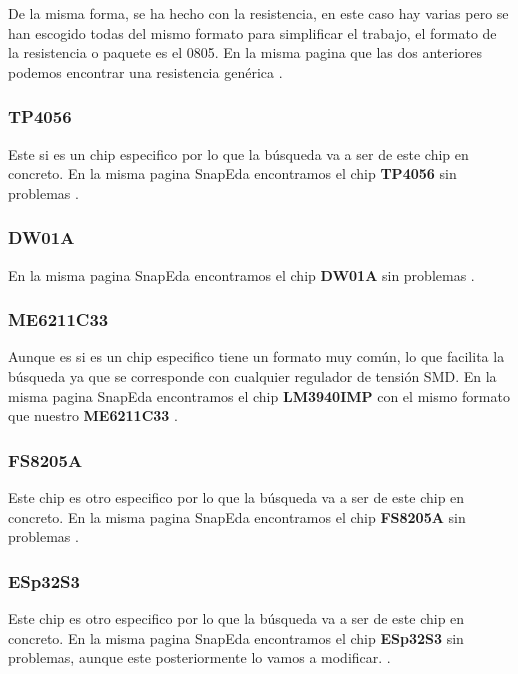 De la misma forma, se ha hecho con la resistencia, en este caso hay varias pero se han escogido todas del mismo formato para simplificar el trabajo, el formato de la resistencia o paquete es el 0805. En la misma pagina que las dos anteriores podemos encontrar una resistencia genérica \cite{SnapedaRes}.

\subsubsection{TP4056}

Este si es un chip especifico por lo que la búsqueda va a ser de este chip en concreto. En la misma pagina SnapEda \cite{Snapeda} encontramos el chip \textbf{TP4056} sin problemas \cite{SnapedaTP4056}.

\subsubsection{DW01A}

En la misma pagina SnapEda \cite{Snapeda} encontramos el chip \textbf{DW01A} sin problemas \cite{SnapedaDW01A}.

\subsubsection{ME6211C33}

Aunque es si es un chip especifico tiene un formato muy común, lo que facilita la búsqueda ya que se corresponde con cualquier regulador de tensión \gls{SMD}. En la misma pagina SnapEda \cite{Snapeda} encontramos el chip \textbf{LM3940IMP} con el mismo formato que nuestro \textbf{ME6211C33} \cite{SnapedaME6211C33}.

\subsubsection{FS8205A}

Este chip es otro especifico por lo que la búsqueda va a ser de este chip en concreto. En la misma pagina SnapEda \cite{Snapeda} encontramos el chip \textbf{FS8205A} sin problemas \cite{SnapedaFS8205A}.

\subsubsection{ESp32S3} \label{ESp32S3BusquedaComponente}

Este chip es otro especifico por lo que la búsqueda va a ser de este chip en concreto. En la misma pagina SnapEda \cite{Snapeda} encontramos el chip \textbf{ESp32S3} sin problemas, aunque este posteriormente lo vamos a modificar. \cite{SnapedaESp32S3}.

